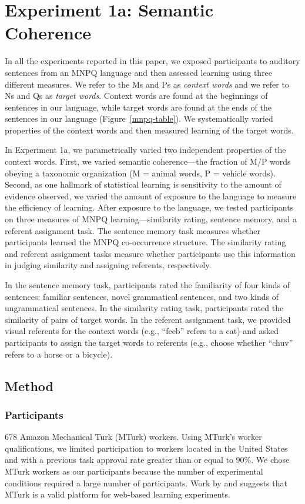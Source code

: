 \documentclass[man,floatsintext]{apa6}
\begin{document}
\section{Experiment 1a: Semantic Coherence}

In all the experiments reported in this paper, we exposed participants to auditory sentences from an MNPQ language and then assessed learning using three different measures. We refer to the Ms and Ps as \emph{context words} and we refer to Ns and Qs as \emph{target words}. Context words are found at the beginnings of sentences in our language, while target words are found at the ends of the sentences in our language (Figure~\ref{mnpq-table}). We systematically varied properties of the context words and then measured learning of the target words.

In Experiment 1a, we parametrically varied two independent properties of the context words. First, we varied semantic coherence---the fraction of M/P words obeying a taxonomic organization (M = animal words, P = vehicle words). Second, as one hallmark of statistical learning is sensitivity to the amount of evidence observed, we varied the amount of exposure to the language to measure the efficiency of learning. After exposure to the language, we tested participants on three measures of MNPQ learning---similarity rating, sentence memory, and a referent assignment task. The sentence memory task measures whether participants learned the MNPQ co-occurrence structure. The similarity rating and referent assignment tasks measure whether participants use this information in judging similarity and assigning referents, respectively.

In the sentence memory task, participants rated the familiarity of four kinds of sentences: familiar sentences, novel grammatical sentences, and two kinds of ungrammatical sentences. In the similarity rating task, participants rated the similarity of pairs of target words. In the referent assignment task, we provided visual referents for the context words (e.g., ``feeb'' refers to a cat) and asked participants to assign the target words to referents (e.g., choose whether ``chuv'' refers to a horse or a bicycle).

\subsection{Method}

\subsubsection{Participants}
678 Amazon Mechanical Turk (MTurk) workers. Using MTurk's worker qualifications, we limited participation to workers located in the United States and with a previous task approval rate greater than or equal to 90\%. We chose MTurk workers as our participants because the number of experimental conditions required a large number of participants. Work by \citet{buhrmester2010} and \citet{crump2013} suggests that MTurk is a valid platform for web-based learning experiments.
\end{document}
